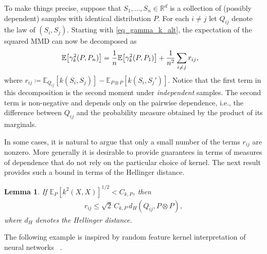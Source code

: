 \documentclass{article}
\newtheorem{lemma}[theorem]{Lemma}
\theoremstyle{definition}
\newcommand{\reals}{\mathbb{R}}
\newcommand{\bEx}{\ensuremath{\mathbb{E}}}
\let\originalleft\left
\let\originalright\right
\renewcommand{\left}{\mathopen{}\mathclose\bgroup\originalleft}
\renewcommand{\right}{\aftergroup\egroup\originalright}
\begin{document}
To make things precise, suppose that $S_1, \dots, S_n \in \reals^d$ is a collection of (possibly dependent) samples with identical distribution $P$. For each $i \ne j$ let $Q_{ij}$ denote the law of $(S_i, S_j)$. 
Starting with \eqref{eq_gamma_k_alt}, the expectation of the squared MMD can now be decomposed as
\begin{align}
  \bEx \left[ \gamma^2_k(P, P_n)  \right] & = \frac{1}{n}   \bEx \left[ \gamma^2_k(P, P_1)  \right]   + \frac{1}{n^2}  \sum_{i \ne  j} r_{ij}, \label{eq:gamma_k_second_moment_dependent}
\end{align}
where $r_{ij} \coloneqq \bEx_{Q_{ij}}[k(S_i, S_j)]  - \bEx_{P\otimes P}[k(S_i, S_j')]$. Notice that the first term in this decomposition is the second moment under \emph{independent} samples. The second term is non-negative and  depends only on the pairwise dependence, i.e., the difference between $Q_{ij}$ and the probability measure obtained by the product of its marginals. 

In some cases, it is natural to argue that only a small number of the terms $r_{ij}$ are nonzero. More generally it is desirable to provide guarantees in terms of measures of dependence that do not rely on the particular choice of kernel. The next result provides such a bound in terms of the Hellinger distance.

\begin{lemma}\label{lem:MMD_converge}
If $\bEx_{P}[k^2(X,X)]^{1/2} < C_{k,P}$,  then
\begin{align*}
r_{ij} \le \sqrt{2}\, C_{k,P} \,  d_H(Q_{ij}, P \otimes P ),
\end{align*}
where $d_{H}$ denotes the Hellinger distance. 
\end{lemma}


The following example is inspired by random feature kernel interpretation of neural networks ~\cite{rahimi2008random}.
\end{document}
